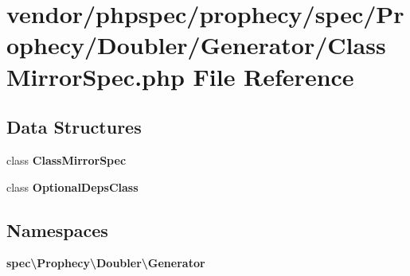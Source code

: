 \section{vendor/phpspec/prophecy/spec/\+Prophecy/\+Doubler/\+Generator/\+Class\+Mirror\+Spec.php File Reference}
\label{_class_mirror_spec_8php}
\subsection*{Data Structures}
\begin{DoxyCompactItemize}
\item 
class {\bf Class\+Mirror\+Spec}
\item 
class {\bf Optional\+Deps\+Class}
\end{DoxyCompactItemize}
\subsection*{Namespaces}
\begin{DoxyCompactItemize}
\item 
 {\bf spec\textbackslash{}\+Prophecy\textbackslash{}\+Doubler\textbackslash{}\+Generator}
\end{DoxyCompactItemize}
